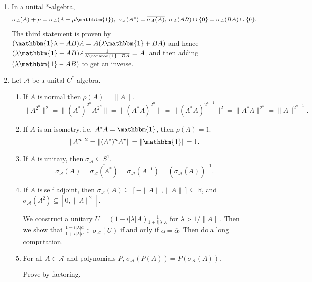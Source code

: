 \documentclass[twoside,symmetric, openany, 12pt]{./tuftebook}
\theoremstyle{definition}
\theoremstyle{definition}
\theoremstyle{definition}
\begin{document}
\begin{enumerate}
		This is the root test: The radius of convergence of $\sum_{n=0}^{\infty} A_n (z-a)^n$ is $\left( \limsup_{n\to\infty} \|A_n\|^{1 / n} \right)^{-1}$.
	\item In a unital *-algebra,
		\[
			\sigma_{\mathcal{A}}(A) +\mu = \sigma_{\mathcal{A}}(A + \mu \mathbbm{1}),~\sigma_{\mathcal{A}}(A^*) = \overline{\sigma_{\mathcal{A}}(A)},~\sigma_{\mathcal{A}}(AB) \cup \{0\} = \sigma_{\mathcal{A}}(BA) \cup \{0\} 
		.\] 
		The third statement is proven by $(\mathbbm{1}\lambda+AB)A=A(\lambda\mathbbm{1}+BA)$ and hence $(\lambda\mathbbm{1}+AB)A \frac{1}{\lambda\mathbbm{1}+BA}=A$, and then adding $(\lambda\mathbbm{1}-AB)$ to get an inverse.
	\item Let $\mathcal{A}$ be a unital $C^*$ algebra.
		\begin{enumerate}
			\item If $A$ is normal then $\rho(A) = \|A\|$.
\[
	\|A^{2^n}\|^2 = \|(A^*)^{2^n}A^{2^n}\|=\|(A^*A)^{2^n}\|=\|(A^*A)^{2^{n-1}}\|^2=\|A^*A\|^{2^n}=\|A\|^{2^{n+1}}
.\] 
\item If $A$ is an isometry, i.e. $A^*A=\mathbbm{1}$, then $\rho(A)=1$. 
	\[
		\|A^n\|^2 = \|(A^*)^nA^n\|=\|\mathbbm{1}\|=1
	.\] 
\item If $A$ is unitary, then $\sigma_{\mathcal{A}}\subseteq S^1$.
	\[
		\sigma_{\mathcal{A}}(A)=\overline{\sigma_{\mathcal{A}}(A^*)}=\overline{\sigma_{\mathcal{A}}(A^{-1})}=\left( \overline{\sigma_{\mathcal{A}}(A)} \right)^{-1}
	.\] 
\item If $A$ is self adjoint, then $\sigma_{\mathcal{A}}(A)\subseteq [-\|A\|, \|A\|]\subseteq \mathbb{R}$, and $\sigma_{\mathcal{A}}(A^2)\subseteq [0,\|A\|^2]$.

	We construct a unitary $U=(1-i|\lambda|A)\frac{1}{1+i|\lambda|A}$ for $\lambda > 1 / \|A\|$. Then we show that $\frac{1-i|\lambda|\alpha}{1+i|\lambda|\alpha}\in \sigma_{\mathcal{A}}(U)$ if and only if $\alpha = \overline{\alpha}$. Then do a long computation.
\item For all $A\in \mathcal{A}$ and polynomials $P$, $\sigma_{\mathcal{A}}(P(A))=P(\sigma_{\mathcal{A}}(A))$.

	Prove by factoring.
		\end{enumerate}
\end{enumerate}
\end{document}

